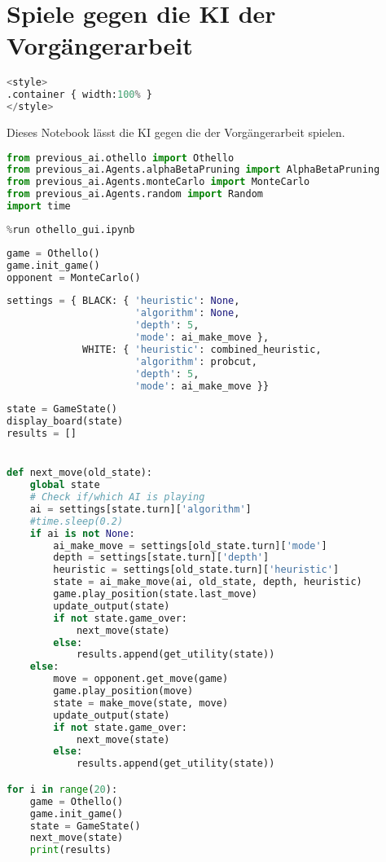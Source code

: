 \hypertarget{spiele-gegen-die-ki-der-vorguxe4ngerarbeit}{%
\section{Spiele gegen die KI der
Vorgängerarbeit}\label{spiele-gegen-die-ki-der-vorguxe4ngerarbeit}}

\label{sec:aivsprevious}

\begin{lstlisting}[language=Python]
%%HTML
<style>
.container { width:100% }
</style>
\end{lstlisting}

Dieses Notebook lässt die \ac{KI} gegen die der Vorgängerarbeit spielen.

\begin{lstlisting}[language=Python]
from previous_ai.othello import Othello
from previous_ai.Agents.alphaBetaPruning import AlphaBetaPruning
from previous_ai.Agents.monteCarlo import MonteCarlo
from previous_ai.Agents.random import Random
import time
\end{lstlisting}

\begin{lstlisting}[language=Python]
%run othello_ai.ipynb
%run othello_gui.ipynb
\end{lstlisting}

\begin{lstlisting}[language=Python]
game = Othello()
game.init_game()
opponent = MonteCarlo()
\end{lstlisting}

\begin{lstlisting}[language=Python]
settings = { BLACK: { 'heuristic': None,
                      'algorithm': None,
                      'depth': 5,
                      'mode': ai_make_move },
             WHITE: { 'heuristic': combined_heuristic,
                      'algorithm': probcut,
                      'depth': 5,
                      'mode': ai_make_move }}
\end{lstlisting}

\begin{lstlisting}[language=Python]
state = GameState()
display_board(state)
results = []


def next_move(old_state):
    global state
    # Check if/which AI is playing
    ai = settings[state.turn]['algorithm']
    #time.sleep(0.2)
    if ai is not None:
        ai_make_move = settings[old_state.turn]['mode']
        depth = settings[state.turn]['depth']
        heuristic = settings[old_state.turn]['heuristic']
        state = ai_make_move(ai, old_state, depth, heuristic)
        game.play_position(state.last_move)
        update_output(state)
        if not state.game_over:
            next_move(state)
        else:
            results.append(get_utility(state))
    else:
        move = opponent.get_move(game)
        game.play_position(move)
        state = make_move(state, move)
        update_output(state)
        if not state.game_over:
            next_move(state)
        else:
            results.append(get_utility(state))

for i in range(20):
    game = Othello()
    game.init_game()
    state = GameState()
    next_move(state)
    print(results)
\end{lstlisting}
